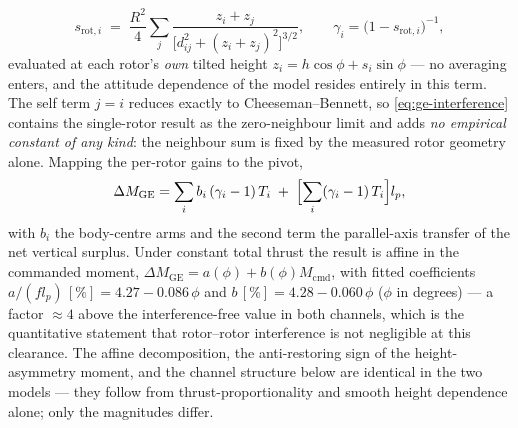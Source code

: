 \begin{equation}
  s_{\mathrm{rot},i} \;=\; \frac{R^2}{4}\sum_j
  \frac{z_i + z_j}{\bigl[d_{ij}^2 + (z_i+z_j)^2\bigr]^{3/2}},
  \qquad \gamma_i = \bigl(1 - s_{\mathrm{rot},i}\bigr)^{-1},
  \label{eq:ge-interference}
\end{equation}
evaluated at each rotor's \emph{own} tilted height
$z_i = h\cos\phi + s_i\sin\phi$ — no averaging enters, and the
attitude dependence of the model resides entirely in this term. The
self term $j = i$ reduces exactly to Cheeseman--Bennett, so
\eqref{eq:ge-interference} contains the single-rotor result as the
zero-neighbour limit and adds \emph{no empirical constant of any
kind}: the neighbour sum is fixed by the measured rotor geometry
alone. Mapping the per-rotor gains to the pivot,
\begin{equation}
  \Delta M_{\mathrm{GE}}
  = \sum_i b_i\,(\gamma_i-1)\,T_i
  \;+\; \Bigl[\sum_i (\gamma_i-1)\,T_i\Bigr] l_p ,
  \label{eq:ge-mapping}
\end{equation}
with $b_i$ the body-centre arms and the second term the parallel-axis
transfer of the net vertical surplus. Under constant total thrust the
result is affine in the commanded moment,
$\Delta M_{\mathrm{GE}} = a(\phi) + b(\phi) M_{\mathrm{cmd}}$, with
fitted coefficients $a/(f l_p)\,[\%] = 4.27 - 0.086\,\phi$ and
$b\,[\%] = 4.28 - 0.060\,\phi$ ($\phi$ in degrees) — a factor
$\approx 4$ above the interference-free value in both channels, which
is the quantitative statement that rotor--rotor interference is not
negligible at this clearance. The affine decomposition, the
anti-restoring sign of the height-asymmetry moment, and the channel
structure below are identical in the two models — they follow from
thrust-proportionality and smooth height dependence alone; only the
magnitudes differ.


